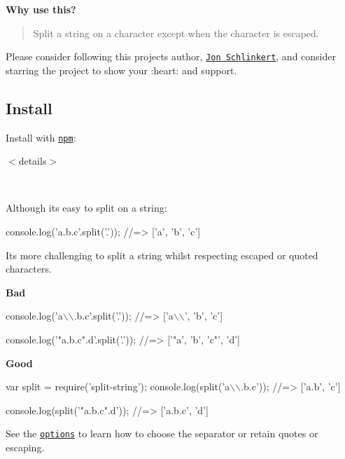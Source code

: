 {\bfseries Why use this?}

\begin{quote}
Split a string on a character except when the character is escaped. \end{quote}


Please consider following this project\textquotesingle{}s author, \href{https://github.com/jonschlinkert}{\tt Jon Schlinkert}, and consider starring the project to show your \+:heart\+: and support.

\subsection*{Install}

Install with \href{https://www.npmjs.com/}{\tt npm}\+:




$<$details$>$

~\newline


Although it\textquotesingle{}s easy to split on a string\+:


\begin{DoxyCode}
console.log('a.b.c'.split('.'));
//=> ['a', 'b', 'c']
\end{DoxyCode}


It\textquotesingle{}s more challenging to split a string whilst respecting escaped or quoted characters.

{\bfseries Bad}


\begin{DoxyCode}
console.log('a\(\backslash\)\(\backslash\).b.c'.split('.'));
//=> ['a\(\backslash\)\(\backslash\)', 'b', 'c']

console.log('"a.b.c".d'.split('.'));
//=> ['"a', 'b', 'c"', 'd']
\end{DoxyCode}


{\bfseries Good}


\begin{DoxyCode}
var split = require('split-string');
console.log(split('a\(\backslash\)\(\backslash\).b.c'));
//=> ['a.b', 'c']

console.log(split('"a.b.c".d'));
//=> ['a.b.c', 'd']
\end{DoxyCode}


See the \href{#options}{\tt options} to learn how to choose the separator or retain quotes or escaping.

